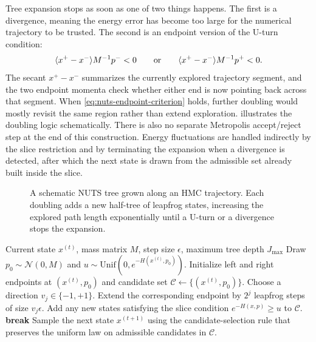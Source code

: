 Tree expansion stops as soon as one of two things happens.
The first is a divergence, meaning the energy error has become too large for the numerical trajectory to be trusted.
The second is an endpoint version of the U-turn condition:
\begin{equation}
  \langle x^+ - x^-\rangle{M^{-1}p^-} < 0
  \qquad\text{or}\qquad
  \langle x^+ - x^-\rangle{M^{-1}p^+} < 0.
  \label{eq:nuts-endpoint-criterion}
\end{equation}
The secant $x^+-x^-$ summarizes the currently explored trajectory segment, and the two endpoint momenta check whether either end is now pointing back across that segment.
When \eqref{eq:nuts-endpoint-criterion} holds, further doubling would mostly revisit the same region rather than extend exploration.
 illustrates the doubling logic schematically.
There is also no separate Metropolis accept/reject step at the end of this construction.
Energy fluctuations are handled indirectly by the slice restriction and by terminating the expansion when a divergence is detected, after which the next state is drawn from the admissible set already built inside the slice.

\begin{figure}[H]
  \centering
  
  \caption{A schematic NUTS tree grown along an HMC trajectory.
  Each doubling adds a new half-tree of leapfrog states, increasing the explored path length exponentially until a U-turn or a divergence stops the expansion.}
  \label{fig:nuts-tree-growth}
\end{figure}

\begin{algorithm}[H]
  \caption{High-level NUTS iteration}
  \label{alg:nuts}
  \begin{algorithmic}[1]
    \Require Current state $x^{(t)}$, mass matrix $M$, step size $\epsilon$, maximum tree depth $J_{\max}$
    \State Draw $p_0 \sim \mathcal{N}(0,M)$ and $u \sim \mathrm{Unif}\!\left(0,e^{-H(x^{(t)},p_0)}\right)$.
    \State Initialize left and right endpoints at $(x^{(t)},p_0)$ and candidate set $\mathcal{C}\gets\{(x^{(t)},p_0)\}$.
      \State Choose a direction $v_j\in\{-1,+1\}$.
      \State Extend the corresponding endpoint by $2^j$ leapfrog steps of size $v_j\epsilon$.
      \State Add any new states satisfying the slice condition $e^{-H(x,p)}\ge u$ to $\mathcal{C}$.
        \State \textbf{break}
      \EndIf
    \EndFor
    \State Sample the next state $x^{(t+1)}$ using the candidate-selection rule that preserves the uniform law on admissible candidates in $\mathcal{C}$.
\end{algorithmic}
\end{algorithm}

